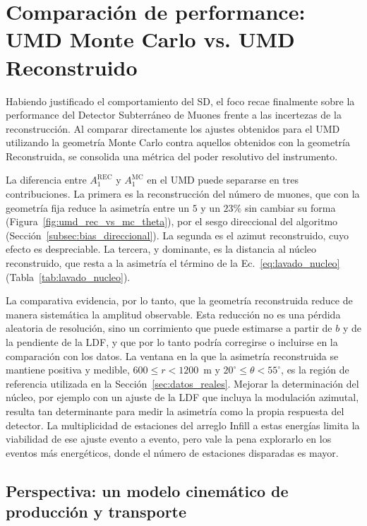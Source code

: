 \section{Comparación de performance: UMD Monte Carlo vs. UMD Reconstruido}
\label{subsec:comparacion_performance_umd}

Habiendo justificado el comportamiento del SD, el foco recae finalmente sobre la performance del Detector Subterráneo de Muones frente a las incertezas de la reconstrucción. Al comparar directamente los ajustes obtenidos para el UMD utilizando la geometría Monte Carlo contra aquellos obtenidos con la geometría Reconstruida, se consolida una métrica del poder resolutivo del instrumento.

La diferencia entre $A_1^{\mathrm{REC}}$ y $A_1^{\mathrm{MC}}$ en el UMD puede separarse en tres contribuciones. La primera es la reconstrucción del número de muones, que con la geometría fija reduce la asimetría entre un $5$ y un $23\%$ sin cambiar su forma (Figura~\ref{fig:umd_rec_vs_mc_theta}), por el sesgo direccional del algoritmo (Sección~\ref{subsec:bias_direccional}). La segunda es el azimut reconstruido, cuyo efecto es despreciable. La tercera, y dominante, es la distancia al núcleo reconstruido, que resta a la asimetría el término de la Ec.~\ref{eq:lavado_nucleo} (Tabla~\ref{tab:lavado_nucleo}).

La comparativa evidencia, por lo tanto, que la geometría reconstruida reduce de manera sistemática la amplitud observable. Esta reducción no es una pérdida aleatoria de resolución, sino un corrimiento que puede estimarse a partir de $b$ y de la pendiente de la LDF, y que por lo tanto podría corregirse o incluirse en la comparación con los datos. La ventana en la que la asimetría reconstruida se mantiene positiva y medible, $600 \leq r < 1200$~m y $20^\circ \leq \theta < 55^\circ$, es la región de referencia utilizada en la Sección~\ref{sec:datos_reales}. Mejorar la determinación del núcleo, por ejemplo con un ajuste de la LDF que incluya la modulación azimutal, resulta tan determinante para medir la asimetría como la propia respuesta del detector. La multiplicidad de estaciones del arreglo Infill a estas energías limita la viabilidad de ese ajuste evento a evento, pero vale la pena explorarlo en los eventos más energéticos, donde el número de estaciones disparadas es mayor.

\subsection{Perspectiva: un modelo cinemático de producción y transporte}
\label{subsec:perspectiva_cinematica}

